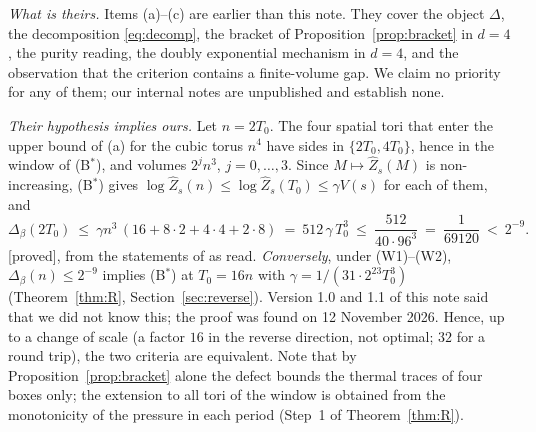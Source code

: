\documentclass[11pt,a4paper]{article}
\theoremstyle{plain}
\theoremstyle{definition}
\theoremstyle{remark}
\numberwithin{equation}{section}
\newcommand{\st}[1]{\textsf{[#1]}}
\begin{document}
\emph{What is theirs.} Items (a)--(c) are earlier than this note. They cover the object $\Delta$, the decomposition \eqref{eq:decomp}, the
bracket of Proposition~\ref{prop:bracket} in $d=4$, the purity reading, the doubly exponential mechanism in $d=4$, and the observation that
the criterion contains a finite-volume gap. We claim no priority for any of them; our internal notes \cite{internal} are unpublished and
establish none.

\emph{Their hypothesis implies ours.} Let $n=2T_0$. The four spatial tori that enter the upper bound of (a) for the cubic torus $n^4$ have
sides in $\{2T_0,4T_0\}$, hence in the window of (B$^*$), and volumes $2^jn^3$, $j=0,\dots,3$. Since $M\mapsto\widehat Z_s(M)$ is
non-increasing, (B$^*$) gives $\log\widehat Z_s(n)\le\log\widehat Z_s(T_0)\le\gamma V(s)$ for each of them, and
\begin{equation}\label{eq:bb26implies}
\Delta_\beta(2T_0)\ \le\ \gamma n^3\,(16+8\cdot2+4\cdot4+2\cdot8)\ =\ 512\,\gamma\,T_0^3\ \le\ \frac{512}{40\cdot96^3}\ =\ \frac1{69120}\ <\ 2^{-9}.
\end{equation}
\st{proved}, from the statements of \cite{BB26v5} as read. \emph{Conversely}, under (W1)--(W2), $\Delta_\beta(n)\le2^{-9}$ implies (B$^*$) at $T_0=16n$ with $\gamma=1/(31\cdot2^{23}T_0^3)$ (Theorem~\ref{thm:R}, Section~\ref{sec:reverse}). Version 1.0 and 1.1 of this note said that we did not know this; the proof was found on 12 November 2026. Hence, up to a change of scale (a factor $16$ in the reverse direction, not optimal; $32$ for a round trip), the two criteria are equivalent. Note that by Proposition~\ref{prop:bracket} alone the defect bounds the thermal traces of four boxes only; the extension to all tori of the window is obtained from the monotonicity of the pressure in each period (Step~1 of Theorem~\ref{thm:R}).
\end{document}
